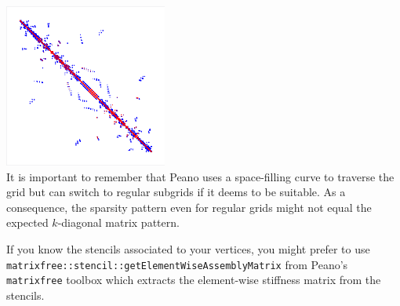 \begin{center}
  \includegraphics[width=0.4\textwidth]{43_dg/matrix-pattern.png}
  \\
  {
  \footnotesize
  It is important to remember that Peano uses a space-filling curve to traverse
  the grid but can switch to regular subgrids if it deems to be suitable. As a
  consequence, the sparsity pattern even for regular grids might not equal the
  expected $k$-diagonal matrix pattern.
  }
\end{center}

\begin{remark}
  If you know the stencils associated to your vertices, you might prefer to use
  \texttt{matrixfree::stencil::getElementWiseAssemblyMatrix} from Peano's
  \texttt{matrixfree} toolbox which extracts the element-wise stiffness matrix
  from the stencils.
\end{remark}

